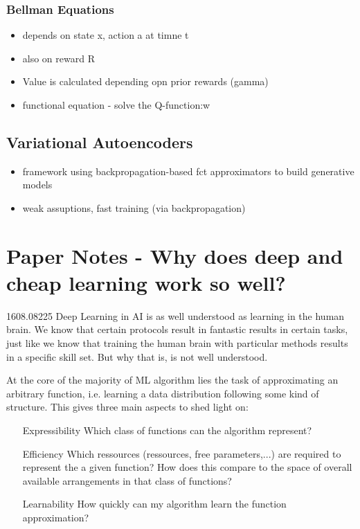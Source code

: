 \subsubsection{Bellman Equations}
\begin{itemize}
  \item depends on state x, action a at timne t
  \item also on reward R
  \item Value is calculated depending opn prior rewards (gamma)
  \item functional equation - solve the Q-function:w
\end{itemize}


\subsection{Variational Autoencoders}
\begin{itemize}
  \item framework using backpropagation-based fct approximators to build
	generative models
  \item weak assuptions, fast training (via backpropagation)
\end{itemize}



\section{Paper Notes - Why does deep and cheap learning work so well?}
1608.08225
Deep Learning in AI is as well understood as learning in the human brain. We
know that certain protocols result in fantastic results in certain tasks, just
like we know that training the human brain with particular methods results in a
specific skill set. But why that is, is not well understood.

At the core of the majority of ML algorithm lies the task of approximating an
arbitrary function, i.e. learning a data distribution following some kind of
structure. This gives three main aspects to shed light on:
\begin{itemize}
  \item[Expressibility] Which class of functions can the algorithm represent?
  \item[Efficiency] Which ressources (ressources, free parameters,...) are
	required to represent the a given function? How does this compare to the
	space of overall available arrangements in that class of functions?
  \item[Learnability] How quickly can my algorithm learn the function
	approximation?
\end{itemize}

